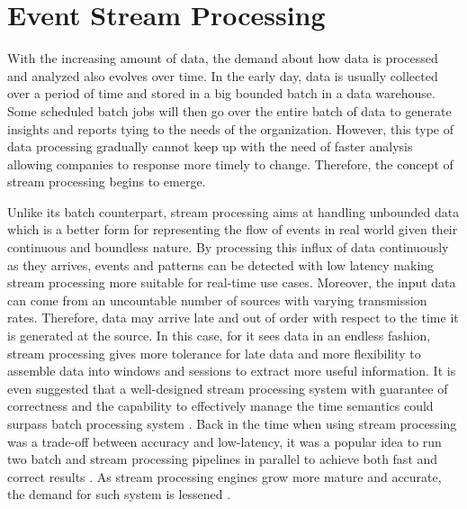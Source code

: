 \section{Event Stream Processing} \label{section:eventstreamprocessing}
With the increasing amount of data, the demand about how data is processed and analyzed also evolves over time. In the early day, data is usually collected over a period of time and stored in a big bounded batch in a data warehouse. Some scheduled batch jobs will then go over the entire batch of data to generate insights and reports tying to the needs of the organization. However, this type of data processing gradually cannot keep up with the need of faster analysis allowing companies to response more timely to change. Therefore, the concept of stream processing begins to emerge.


Unlike its batch counterpart, stream processing aims at handling unbounded data which is a better form for representing the flow of events in real world given their continuous and boundless nature. By processing this influx of data continuously as they arrives, events and patterns can be detected with low latency making stream processing more suitable for real-time use cases. Moreover, the input data can come from an uncountable number of sources with varying transmission rates. Therefore, data may arrive late and out of order with respect to the time it is generated at the source. In this case, for it sees data in an endless fashion, stream processing gives more tolerance for late data and more flexibility to assemble data into windows and sessions to extract more useful information. It is even suggested that a well-designed stream processing system with guarantee of correctness and the capability to effectively manage the time semantics could surpass batch processing system \cite{stream101}. Back in the time when using stream processing was a trade-off between accuracy and low-latency, it was a popular idea to run two batch and stream processing pipelines in parallel to achieve both fast and correct results \cite{lambdaarchitecture}.  As stream processing engines grow more mature and accurate, the demand for such system is lessened \cite{questionlambdaarchitecture}.

